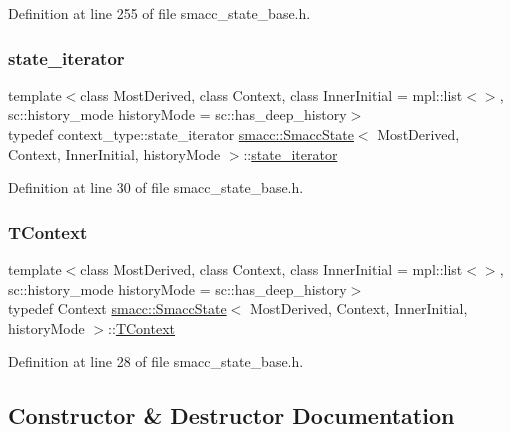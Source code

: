 Definition at line 255 of file smacc\+\_\+state\+\_\+base.\+h.

\mbox{\label{classsmacc_1_1SmaccState_a12497b38e710f07cacb5d45efc024339}} 
\subsubsection{\texorpdfstring{state\+\_\+iterator}{state\_iterator}}
{\footnotesize\ttfamily template$<$class Most\+Derived, class Context, class Inner\+Initial = mpl\+::list$<$$>$, sc\+::history\+\_\+mode history\+Mode = sc\+::has\+\_\+deep\+\_\+history$>$ \\
typedef context\+\_\+type\+::state\+\_\+iterator \hyperlink{classsmacc_1_1SmaccState}{smacc\+::\+Smacc\+State}$<$ Most\+Derived, Context, Inner\+Initial, history\+Mode $>$\+::\hyperlink{classsmacc_1_1SmaccState_a12497b38e710f07cacb5d45efc024339}{state\+\_\+iterator}}



Definition at line 30 of file smacc\+\_\+state\+\_\+base.\+h.

\mbox{\label{classsmacc_1_1SmaccState_a9953ba0428a8c46f7d72c70bc3f87db4}} 
\subsubsection{\texorpdfstring{T\+Context}{TContext}}
{\footnotesize\ttfamily template$<$class Most\+Derived, class Context, class Inner\+Initial = mpl\+::list$<$$>$, sc\+::history\+\_\+mode history\+Mode = sc\+::has\+\_\+deep\+\_\+history$>$ \\
typedef Context \hyperlink{classsmacc_1_1SmaccState}{smacc\+::\+Smacc\+State}$<$ Most\+Derived, Context, Inner\+Initial, history\+Mode $>$\+::\hyperlink{classsmacc_1_1SmaccState_a9953ba0428a8c46f7d72c70bc3f87db4}{T\+Context}}



Definition at line 28 of file smacc\+\_\+state\+\_\+base.\+h.



\subsection{Constructor \& Destructor Documentation}
\mbox{\label{classsmacc_1_1SmaccState_a2fbeaca0f063a909d17de2c3040c8d17}} 
